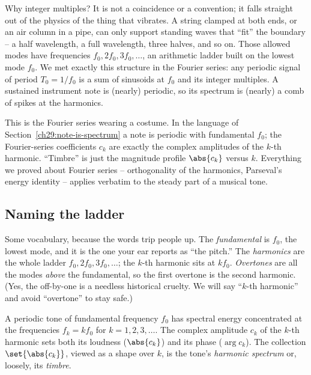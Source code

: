 Why integer multiples? It is not a coincidence or a convention; it falls straight out of the physics
of the thing that vibrates. A string clamped at both ends, or an air column in a pipe, can only
support standing waves that ``fit'' the boundary -- a half wavelength, a full wavelength, three
halves, and so on. Those allowed modes have frequencies $f_0, 2f_0, 3f_0, \dots$, an arithmetic
ladder built on the lowest mode $f_0$. We met exactly this structure in the Fourier series: any
periodic signal of period $T_0 = 1/f_0$ is a sum of sinusoids at $f_0$ and its integer multiples. A
sustained instrument note is (nearly) periodic, so its spectrum is (nearly) a comb of spikes at the
harmonics.

\begin{connectionbox}
This is the Fourier series wearing a costume. In the language of Section~\ref{ch29:note-is-spectrum}
a note is periodic with fundamental $f_0$; the Fourier-series coefficients $c_k$ are exactly the
complex amplitudes of the $k$-th harmonic. ``Timbre'' is just the magnitude profile $\abs{c_k}$
versus $k$. Everything we proved about Fourier series -- orthogonality of the harmonics, Parseval's
energy identity -- applies verbatim to the steady part of a musical tone.
\end{connectionbox}

\subsection*{Naming the ladder}

Some vocabulary, because the words trip people up. The \emph{fundamental} is $f_0$, the lowest mode,
and it is the one your ear reports as ``the pitch.'' The \emph{harmonics} are the whole ladder $f_0,
2f_0, 3f_0, \dots$; the $k$-th harmonic sits at $k f_0$. \emph{Overtones} are all the modes
\emph{above} the fundamental, so the first overtone is the second harmonic. (Yes, the off-by-one is a
needless historical cruelty. We will say ``$k$-th harmonic'' and avoid ``overtone'' to stay safe.)

\begin{definition}
\label{ch29:def-harmonics}
A periodic tone of fundamental frequency $f_0$ has spectral energy concentrated at the frequencies
$f_k = k f_0$ for $k = 1, 2, 3, \dots$. The complex amplitude $c_k$ of the $k$-th harmonic sets both
its loudness ($\abs{c_k}$) and its phase ($\arg c_k$). The collection $\set{\abs{c_k}}$, viewed as a
shape over $k$, is the tone's \emph{harmonic spectrum} or, loosely, its \emph{timbre}.
\end{definition}


